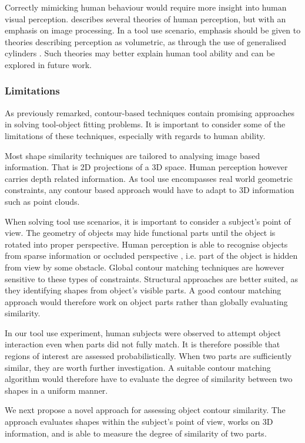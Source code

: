 \documentclass[11]{article}
\begin{document}
Correctly mimicking human behaviour would require more insight into human visual perception.
\cite{loncaric1998} describes several theories of human perception, but with an emphasis on image processing.
In a tool use scenario, emphasis should be given to theories describing perception as volumetric, as through the use of generalised cylinders \cite{dickinson2014}.
Such theories may better explain human tool ability and can be explored in future work.    

\subsubsection{Limitations}
As previously remarked, contour-based techniques contain promising approaches in solving tool-object fitting problems.
It is important to consider some of the limitations of these techniques, especially with regards to human ability. 

Most shape similarity techniques are tailored to analysing image based information. 
That is 2D projections of a 3D space.
Human perception however carries depth related information.
As tool use encompasses real world geometric constraints, any contour based approach would have to adapt to 3D information such as point clouds.

When solving tool use scenarios, it is important to consider a subject's point of view.
The geometry of objects may hide functional parts until the object is rotated into proper perspective.
Human perception is able to recognise objects from sparse information or occluded perspective \cite{loncaric1998}, i.e. part of the object is hidden from view by some obstacle.
Global contour matching techniques are however sensitive to these types of constraints.
Structural approaches are better suited, as they identifying shapes from object's visible parts.
A good contour matching approach would therefore work on object parts rather than globally evaluating similarity.

In our tool use experiment, human subjects were observed to attempt object interaction even when parts did not fully match. 
It is therefore possible that regions of interest are assessed probabilistically. 
When two parts are sufficiently similar, they are worth further investigation.
A suitable contour matching algorithm would therefore have to evaluate the degree of similarity between two shapes in a uniform manner. 

We next propose a novel approach for assessing object contour similarity.
The approach evaluates shapes within the subject's point of view, works on 3D information, and is able to measure the degree of similarity of two parts.
\end{document}
